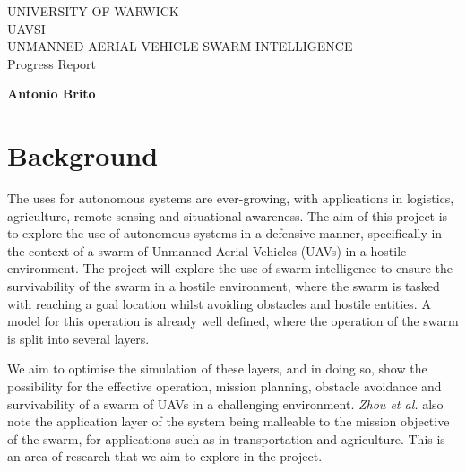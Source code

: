 \documentclass{article}
\begin{document}
\begin{titlepage}
   \begin{center}
        \large UNIVERSITY OF WARWICK\\
       \vspace*{8cm}
        \Huge UAVSI
        \\
        \vspace{0.5cm}
        \normalsize UNMANNED AERIAL VEHICLE SWARM INTELLIGENCE
        \\
        \vspace{0.2cm}
        Progress Report
            
       \vspace{5cm}

       \large \textbf{Antonio Brito}
			
			\smallskip

       \vfill

   \end{center}
\end{titlepage}


\section{Background}
The uses for autonomous systems are ever-growing, with applications in logistics, agriculture, remote sensing and situational awareness\cite{muchiri}\cite{drury}. The aim of this project is to explore the use of autonomous systems in a defensive manner, specifically in the context of a swarm of Unmanned Aerial Vehicles (UAVs) in a hostile environment. The project will explore the use of swarm intelligence to ensure the survivability of the swarm in a hostile environment, where the swarm is tasked with reaching a goal location whilst avoiding obstacles and hostile entities. A model for this operation is already well defined\cite[p.183857-183858]{zhou}, where the operation of the swarm is split into several layers.

We aim to optimise the simulation of these layers, and in doing so, show the possibility for the effective operation, mission planning, obstacle avoidance and survivability of a swarm of UAVs in a challenging environment. \emph{Zhou et al.} also note the application layer of the system being malleable to the mission objective of the swarm, for applications such as in transportation and agriculture. This is an area of research that we aim to explore in the project\cite[p.183871-183872]{zhou}.
\end{document}
